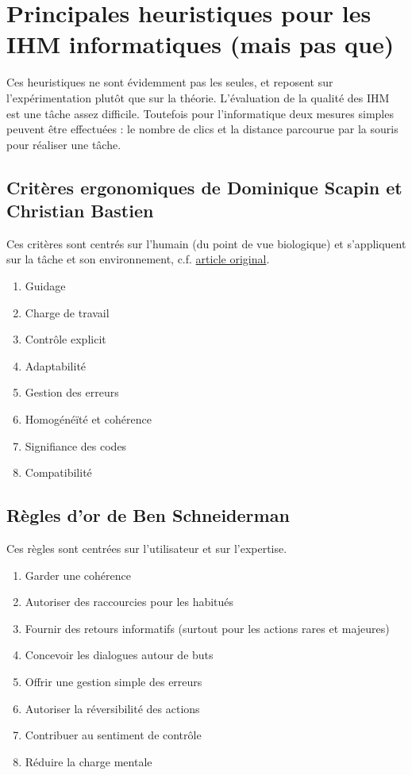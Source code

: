 \documentclass[10pt]{article}
\begin{document}
\section{Principales heuristiques pour les IHM informatiques (mais pas que)}

Ces heuristiques ne sont évidemment pas les seules, et reposent sur l'expérimentation plutôt que sur la théorie.
L'évaluation de la qualité des IHM est une tâche assez difficile. Toutefois pour l'informatique deux mesures simples
peuvent être effectuées : le nombre de clics et la distance parcourue par la souris pour réaliser une tâche.

\subsection{Critères ergonomiques de Dominique Scapin et Christian Bastien}

Ces critères sont centrés sur l'humain (du point de vue
biologique) et s'appliquent sur la tâche et son environnement, c.f. \href{https://hal.inria.fr/inria-00070012/fr/}{article original}.

\begin{enumerate}
\item{Guidage}
\item{Charge de travail}
\item{Contrôle explicit}
\item{Adaptabilité}
\item{Gestion des erreurs}
\item{Homogénéïté et cohérence}
\item{Signifiance des codes}
\item{Compatibilité}
\end{enumerate}

\subsection{Règles d'or de Ben Schneiderman}

Ces règles sont centrées sur l'utilisateur et sur
l'expertise.

\begin{enumerate}
\item{Garder une cohérence}
\item{Autoriser des raccourcies pour les habitués}
\item{Fournir des retours informatifs (surtout pour les actions rares et majeures)}
\item{Concevoir les dialogues autour de buts}
\item{Offrir une gestion simple des erreurs}
\item{Autoriser la réversibilité des actions}
\item{Contribuer au sentiment de contrôle}
\item{Réduire la charge mentale}
\end{enumerate}
\end{document}
